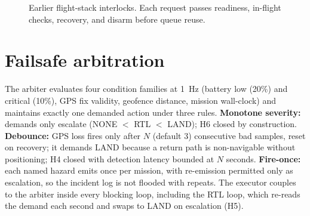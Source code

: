 \documentclass[12pt,a4paper]{report}
\begin{document}
\begin{figure}[htbp]
\centering
{}
\caption{Earlier flight-stack interlocks. Each request passes
readiness, in-flight checks, recovery, and disarm before queue reuse.}
\label{fig:interlock}
\end{figure}

\section{Failsafe arbitration}
\label{sec:arbiter}

The arbiter evaluates four condition families at 1~Hz (battery low
(20\%) and critical (10\%), GPS fix validity, geofence distance,
mission wall-clock) and maintains exactly one demanded action under
three rules. \textbf{Monotone severity:} demands only escalate (NONE
$<$ RTL $<$ LAND); H6 closed by construction. \textbf{Debounce:} GPS
loss fires only after $N$ (default 3) consecutive bad samples, reset
on recovery; it demands LAND because a return path is non-navigable
without positioning; H4 closed with detection latency bounded at $N$
seconds. \textbf{Fire-once:} each named hazard emits once per
mission, with re-emission permitted only as escalation, so the
incident log is not flooded with repeats. The executor couples to the
arbiter inside every blocking
loop, including the RTL loop, which re-reads the demand each
second and swaps to LAND on escalation (H5).
\end{document}

